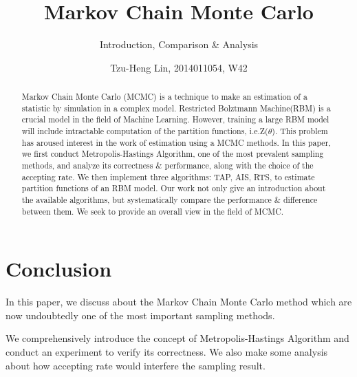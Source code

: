 \documentclass{sig-alternate-05-2015}
\begin{document}
\title{Markov Chain Monte Carlo}
\subtitle{Introduction, Comparison \& Analysis}
\author{
    \alignauthor Tzu-Heng Lin, 2014011054, W42\\
}


\maketitle
\begin{abstract}
Markov Chain Monte Carlo (MCMC) is a technique to make an estimation of a statistic by simulation in a complex model. Restricted Bolztmann Machine(RBM) is a crucial model in the field of Machine Learning. However, training a large RBM model will include intractable computation of the partition functions, i.e.Z($\theta$). This problem has aroused interest in the work of estimation using a MCMC methods.
In this paper, we first conduct Metropolis-Hastings Algorithm, one of the most prevalent sampling methods, and analyze its correctness \& performance, along with the choice of the accepting rate. We then implement three algorithms: TAP, AIS, RTS, to estimate partition functions of an RBM model. Our work not only give an introduction about the available algorithms, but systematically compare the performance \& difference between them. We seek to provide an overall view in the field of MCMC.
\end{abstract}




%
%
\printccsdesc



\newpage

\newpage





\newpage
\section{Conclusion} \label{sec:conclusion}
In this paper, we discuss about the Markov Chain Monte Carlo method which are now undoubtedly one of the most important sampling methods.

We comprehensively introduce the concept of Metropolis-Hastings Algorithm and conduct an experiment to verify its correctness. We also make some analysis about how accepting rate would interfere the sampling result.
\end{document}
